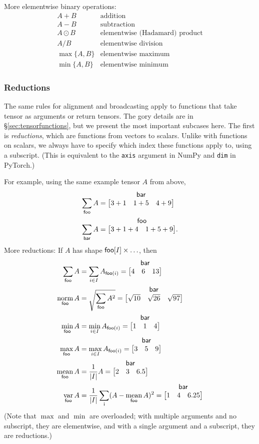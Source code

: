\documentclass{article}
\makeatletter
\newcommand{\nmatrix}[3]{\name{#1}\begin{array}[b]{@{}c@{}}\name{#2}\\\begin{bmatrix}#3\end{bmatrix}\end{array}}
\makeatother
\begin{document}
More elementwise binary operations:
\[\begin{array}{cl}
A+B & \text{addition} \\
A-B & \text{subtraction} \\
A\odot B & \text{elementwise (Hadamard) product} \\
A / B & \text{elementwise division} \\
\max \{A, B\} & \text{elementwise maximum} \\
\min \{A, B\} & \text{elementwise minimum}
\end{array}\]

\subsubsection{Reductions}

The same rules for alignment and broadcasting apply to functions that take tensor as arguments or return tensors. The gory details are in \S\ref{sec:tensorfunctions}, but we present the most important subcases here. The first is \emph{reductions}, which are functions from vectors to scalars. Unlike with functions on scalars, we always have to specify which index these functions apply to, using a subscript. (This is equivalent to the \verb|axis| argument in NumPy and \verb|dim| in PyTorch.)

For example, using the same example tensor $A$ from above,
\begin{align*}
\nsum{foo} A &= \nmatrix{}{bar}{
  3+1 & 1+5 & 4+9
} \\
\nsum{bar} A &= \nmatrix{}{foo}{
  3+1+4 & 1+5+9
}.
\end{align*}
More reductions: If $A$ has shape $\mathsf{foo}[I] \times \ldots$, then
\begin{align*}
  \nsum{foo} A &= \sum_{i \in I} A_{\nidx{foo}{i}} = \nmatrix{}{bar}{4 & 6 & 13} \\
  \nfun{foo}{norm} A &= \sqrt{\nsum{foo} A^2} = \nmatrix{}{bar}{\sqrt{10} & \sqrt{26} & \sqrt{97}} \\
  \nfun{foo}{min} A &= \min_{i \in I} A_{\nidx{foo}{i}} = \nmatrix{}{bar}{1 & 1 & 4} \\
  \nfun{foo}{max} A &= \max_{i \in I} A_{\nidx{foo}{i}} = \nmatrix{}{bar}{3 & 5 & 9} \\
  \nfun{foo}{mean} A &= \frac{1}{|I|} A = \nmatrix{}{bar}{2 & 3 & 6.5} \\
  \nfun{foo}{var} A &= \frac1{|I|} \nsum{i} (A - \nfun{foo}{mean} A)^2 = \nmatrix{}{bar}{1 & 4 & 6.25}
\end{align*}
(Note that $\max$ and $\min$ are overloaded; with multiple arguments and no subscript, they are elementwise, and with a single argument and a subscript, they are reductions.)
\end{document}
